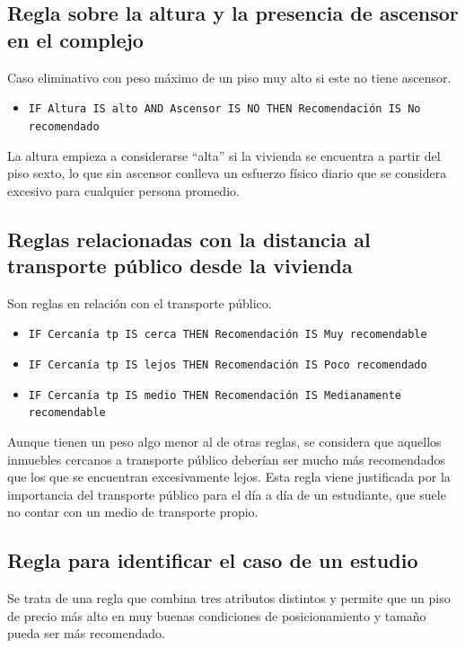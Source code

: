 \documentclass[12pt]{report} %
\begin{document}
    \subsection{Regla sobre la altura y la presencia de ascensor en el complejo}
    Caso eliminativo con peso máximo de un piso muy alto si este no tiene ascensor. 

    \begin{itemize}
        \item \texttt{IF Altura IS alto AND Ascensor IS NO THEN Recomendación IS No recomendado}
    \end{itemize}

    La altura empieza a considerarse ``alta'' si la vivienda se encuentra a partir del piso sexto, 
    lo que sin ascensor conlleva un esfuerzo físico diario que se considera excesivo para cualquier 
    persona promedio.

    \subsection{Reglas relacionadas con la distancia al transporte público desde la vivienda}
    Son reglas en relación con el transporte público.

    \begin{itemize}
        \item \texttt{IF Cercanía tp IS cerca THEN Recomendación IS Muy recomendable}
        \item \texttt{IF Cercanía tp IS lejos THEN Recomendación IS Poco recomendado}
        \item \texttt{IF Cercanía tp IS medio THEN Recomendación IS Medianamente recomendable}
    \end{itemize}
    
    Aunque tienen un peso algo menor al de otras
    reglas, se considera que aquellos inmuebles cercanos a transporte público deberían ser mucho 
    más recomendados que los que se encuentran excesivamente lejos. Esta regla viene justificada
    por la importancia del transporte público para el día a día de un estudiante, que suele no contar 
    con un medio de transporte propio.

    \subsection{Regla para identificar el caso de un estudio}
    Se trata de una regla que combina tres atributos distintos y permite que un piso de precio más 
    alto en muy buenas condiciones de posicionamiento y tamaño pueda ser más recomendado.
\end{document}
